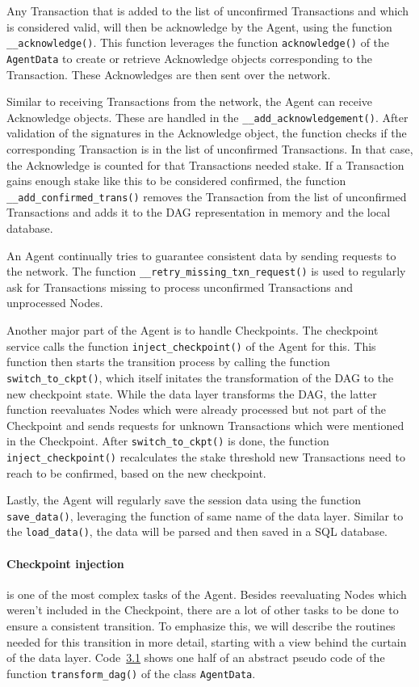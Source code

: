 Any Transaction that is added to the list of unconfirmed Transactions and which is considered valid, will then be acknowledge by the Agent, using the function \texttt{\_\_acknowledge()}. This function leverages the function \texttt{acknowledge()} of the \texttt{AgentData} to create or retrieve Acknowledge objects corresponding to the Transaction. These Acknowledges are then sent over the network.

Similar to receiving Transactions from the network, the Agent can receive Acknowledge objects. These are handled in the \texttt{\_\_add\_acknowledgement()}. After validation of the signatures in the Acknowledge object, the function checks if the corresponding Transaction is in the list of unconfirmed Transactions. In that case, the Acknowledge is counted for that Transactions needed stake. If a Transaction gains enough stake like this to be considered confirmed, the function \texttt{\_\_add\_confirmed\_trans()} removes the Transaction from the list of unconfirmed Transactions and adds it to the DAG representation in memory and the local database.

An Agent continually tries to guarantee consistent data by sending requests to the network. The function \texttt{\_\_retry\_missing\_txn\_request()} is used to regularly ask for Transactions missing to process unconfirmed Transactions and unprocessed Nodes.

Another major part of the Agent is to handle Checkpoints. The checkpoint service calls the function \texttt{inject\_checkpoint()} of the Agent for this. This function then starts the transition process by calling the function \texttt{switch\_to\_ckpt()}, which itself initates the transformation of the DAG to the new checkpoint state. While the data layer transforms the DAG, the latter function reevaluates Nodes which were already processed but not part of the Checkpoint and sends requests for unknown Transactions which were mentioned in the Checkpoint. After \texttt{switch\_to\_ckpt()} is done, the function \texttt{inject\_checkpoint()} recalculates the stake threshold new Transactions need to reach to be confirmed, based on the new checkpoint. 

Lastly, the Agent will regularly save the session data using the function \texttt{save\_data()}, leveraging the function of same name of the data layer. Similar to the \texttt{load\_data()}, the data will be parsed and then saved in a SQL database.

\paragraph{Checkpoint injection} is one of the most complex tasks of the Agent. Besides reevaluating Nodes which weren't included in the Checkpoint, there are a lot of other tasks to be done to ensure a consistent transition. To emphasize this, we will describe the routines needed for this transition in more detail, starting with a view behind the curtain of the data layer. Code~\hyperref[pseudo_transform_dag_1]{3.1} shows one half of an abstract pseudo code of the function \texttt{transform\_dag()} of the class \texttt{AgentData}.

